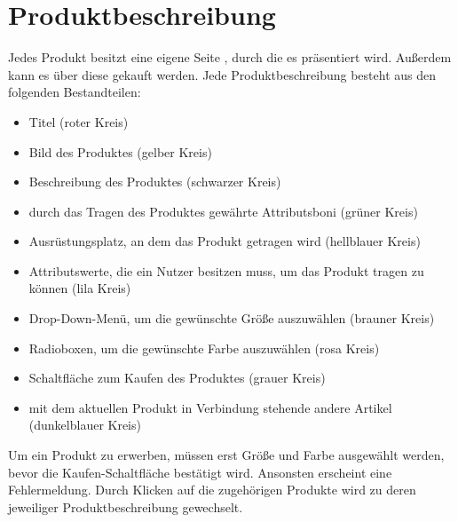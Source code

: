 \newpage

\section{Produktbeschreibung}
\label{chp:Produktbeschreibung}
Jedes Produkt besitzt eine eigene Seite , durch die es präsentiert wird. Außerdem kann es über diese gekauft werden. Jede Produktbeschreibung besteht aus den folgenden Bestandteilen:
\begin{itemize}
  \item Titel (roter Kreis)
  \vspace*{-0.5em}
  \item Bild des Produktes (gelber Kreis)
  \vspace*{-0.5em}
  \item Beschreibung des Produktes (schwarzer Kreis)
  \vspace*{-0.5em}
  \item durch das Tragen des Produktes gewährte Attributsboni  (grüner Kreis)
  \vspace*{-0.5em}
  \item Ausrüstungsplatz, an dem das Produkt getragen wird (hellblauer Kreis)
  \vspace*{-0.5em}
  \item Attributswerte, die ein Nutzer besitzen muss, um das Produkt tragen zu können (lila Kreis)
  \vspace*{-0.5em}
  \item Drop-Down-Menü, um die gewünschte Größe auszuwählen (brauner Kreis)
  \vspace*{-0.5em}
  \item Radioboxen, um die gewünschte Farbe auszuwählen (rosa Kreis)
  \vspace*{-0.5em}
  \item Schaltfläche zum Kaufen des Produktes (grauer Kreis)
  \vspace*{-0.5em}
  \item mit dem aktuellen Produkt in Verbindung stehende andere Artikel (dunkel\-blau\-er Kreis)
\end{itemize}
Um ein Produkt zu erwerben, müssen erst Größe und Farbe ausgewählt werden, bevor die Kaufen-Schaltfläche bestätigt wird. Ansonsten erscheint eine Fehlermeldung. Durch Klicken auf die zugehörigen Produkte wird zu deren jeweiliger Produktbeschreibung gewechselt.

